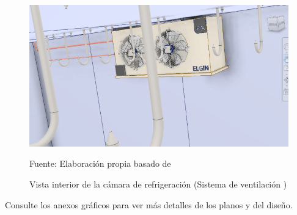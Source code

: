 \begin{figure}[H]
	\centering
	\includegraphics[width=0.46\linewidth]{figures/design-ventils}
	\caption{Vista interior de la cámara de refrigeración (Sistema de ventilación )}
	\label{fig:design-ventils}  Fuente: Elaboración propia basado de 
\end{figure} 
Consulte los anexos gráficos  para ver más detalles de los planos y del diseño.




